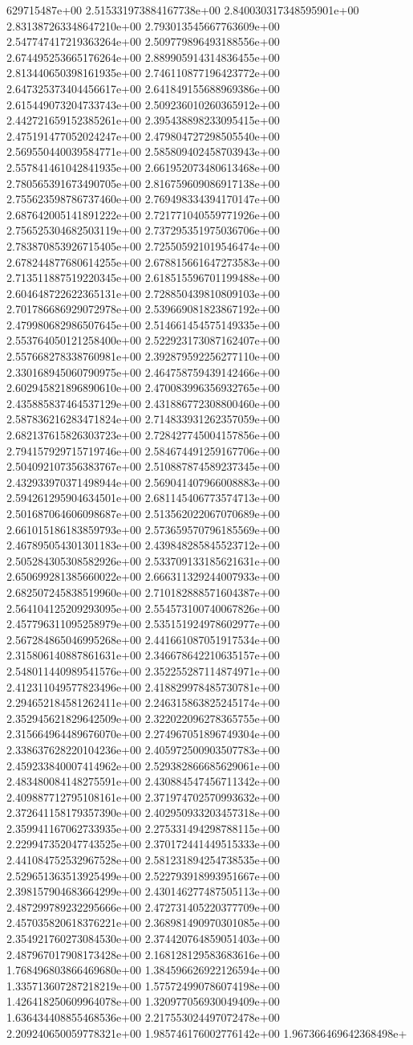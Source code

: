 629715487e+00	2.515331973884167738e+00	2.840030317348595901e+00	2.831387263348647210e+00	2.793013545667763609e+00	2.547747417219363264e+00	2.509779896493188556e+00	2.674495253665176264e+00	2.889905914314836455e+00	2.813440650398161935e+00	2.746110877196423772e+00	2.647325373404456617e+00	2.641849155688969386e+00	2.615449073204733743e+00	2.509236010260365912e+00	2.442721659152385261e+00	2.395438898233095415e+00	2.475191477052024247e+00	2.479804727298505540e+00	2.569550440039584771e+00	2.585809402458703943e+00	2.557841461042841935e+00	2.661952073480613468e+00	2.780565391673490705e+00	2.816759609086917138e+00	2.755623598786737460e+00	2.769498334394170147e+00	2.687642005141891222e+00	2.721771040559771926e+00	2.756525304682503119e+00	2.737295351975036706e+00	2.783870853926715405e+00	2.725505921019546474e+00	2.678244877680614255e+00	2.678815661647273583e+00	2.713511887519220345e+00	2.618515596701199488e+00	2.604648722622365131e+00	2.728850439810809103e+00	2.701786686929072978e+00	2.539669081823867192e+00	2.479980682986507645e+00	2.514661454575149335e+00	2.553764050121258400e+00	2.522923173087162407e+00	2.557668278338760981e+00	2.392879592256277110e+00	2.330168945060790975e+00	2.464758759439142466e+00	2.602945821896890610e+00	2.470083996356932765e+00	2.435885837464537129e+00	2.431886772308800460e+00	2.587836216283471824e+00	2.714833931262357059e+00	2.682137615826303723e+00	2.728427745004157856e+00	2.794157929715719746e+00	2.584674491259167706e+00	2.504092107356383767e+00	2.510887874589237345e+00	2.432933970371498944e+00	2.569041407966008883e+00	2.594261295904634501e+00	2.681145406773574713e+00	2.501687064606098687e+00	2.513562022067070689e+00	2.661015186183859793e+00	2.573659570796185569e+00	2.467895054301301183e+00	2.439848285845523712e+00	2.505284305308582926e+00	2.533709133185621631e+00	2.650699281385660022e+00	2.666311329244007933e+00	2.682507245838519960e+00	2.710182888571604387e+00	2.564104125209293095e+00	2.554573100740067826e+00	2.457796311095258979e+00	2.535151924978602977e+00	2.567284865046995268e+00	2.441661087051917534e+00	2.315806140887861631e+00	2.346678642210635157e+00	2.548011440989541576e+00	2.352255287114874971e+00	2.412311049577823496e+00	2.418829978485730781e+00	2.294652184581262411e+00	2.246315863825245174e+00	2.352945621829642509e+00	2.322022096278365755e+00	2.315664964489676070e+00	2.274967051896749304e+00	2.338637628220104236e+00	2.405972500903507783e+00	2.459233840007414962e+00	2.529382866685629061e+00	2.483480084148275591e+00	2.430884547456711342e+00	2.409887712795108161e+00	2.371974702570993632e+00	2.372641158179357390e+00	2.402950933203457318e+00	2.359941167062733935e+00	2.275331494298788115e+00	2.229947352047743525e+00	2.370172441449515333e+00	2.441084752532967528e+00	2.581231894254738535e+00	2.529651363513925499e+00	2.522793918993951667e+00	2.398157904683664299e+00	2.430146277487505113e+00	2.487299789232295666e+00	2.472731405220377709e+00	2.457035820618376221e+00	2.368981490970301085e+00	2.354921760273084530e+00	2.374420764859051403e+00	2.487967017908173428e+00	2.168128129583683616e+00	1.768496803866469680e+00	1.384596626922126594e+00	1.335713607287218219e+00	1.575724990786074198e+00	1.426418250609964078e+00	1.320977056930049409e+00	1.636434408855468536e+00	2.217553024497072478e+00	2.209240650059778321e+00	1.985746176002776142e+00	1.967366469642368498e+